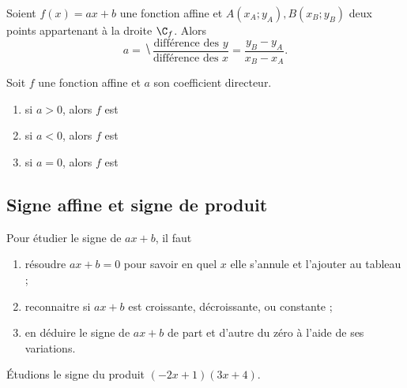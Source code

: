 \begin{theorem}
	Soient $f(x) = ax+b$ une fonction affine et $A(x_A ; y_A), B(x_B ; y_B)$ deux points appartenant à la droite $\C_f$.
	Alors
	\[ a = \hide{\dfrac{\text{différence des $y$}}{\text{différence des $x$}} = \dfrac{y_B - y_A}{x_B-x_A}.} \]
\end{theorem}

\begin{theorem}
	Soit $f$ une fonction affine et $a$ son coefficient directeur.
		\begin{enumerate}	
			\item si $a > 0$, alors $f$ est 
			\item si $a < 0$, alors $f$ est 
			\item si $a = 0$, alors $f$ est 
		\end{enumerate}
\end{theorem}


\subsection{Signe affine et signe de produit}

	Pour étudier le signe de $ax+b$, il faut
	\begin{enumerate}[label=\roman*), leftmargin=50pt]
		\item résoudre $ax+b = 0$ pour savoir en quel $x$ elle s'annule et l'ajouter au tableau ;
		\item reconnaitre si $ax+b$ est croissante, décroissante, ou constante ;
		\item en déduire le signe de $ax+b$ de part et d'autre du zéro à l'aide de ses variations.
	\end{enumerate}

\begin{exemple*}
	Étudions le signe du produit $(-2x+1)(3x+4)$.
	
	
	\begin{center}
	\end{center}

\end{exemple*}

